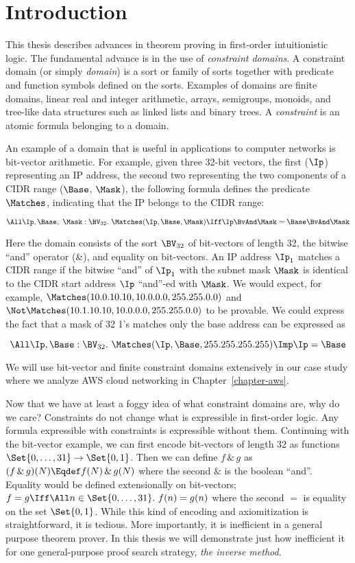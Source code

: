 \chapter{Introduction}
\label{chapter-introduction}

This thesis describes advances in theorem proving in first-order intuitionistic
logic.  The fundamental advance is in the use of \emph{constraint domains}.  A
constraint domain (or simply \emph{domain}) is a sort or family of sorts
together with predicate and function symbols defined on the sorts.  Examples of
domains are finite domains, linear real and integer arithmetic, arrays,
semigroups, monoids, and tree-like data structures such as linked lists and
binary trees.  A \emph{constraint} is an atomic formula belonging to a domain.

An example of a domain that is useful in applications to computer networks is
bit-vector arithmetic.  For example, given three 32-bit vectors, the first
($\Ip$) representing an IP address, the second two representing the two
components of a CIDR range ($\Base$, $\Mask$), the following formula defines the
predicate $\Matches$, indicating that the IP belongs to the CIDR range:

\[
\All\Ip, \Base,\ \Mask: \BV_{32}.\
  \Matches(\Ip, \Base, \Mask) \Iff \Ip \BvAnd \Mask = \Base\BvAnd\Mask
\]

\noindent
Here the domain consists of the sort $\BV_{32}$ of bit-vectors of length 32,
the bitwise ``and'' operator (\&), and equality on bit-vectors.  An IP address
$\Ip_1$ matches a CIDR range if the bitwise ``and'' of $\Ip_1$ with the subnet
mask $\Mask$ is identical to the CIDR start address $\Ip$ ``and''-ed with
$\Mask$.  We would expect, for example,
$\Matches(10.0.10.10, 10.0.0.0, 255.255.0.0)$ and
$\Not\Matches(10.1.10.10, 10.0.0.0, 255.255.0.0)$ to be
provable.  We could express the fact that a mask of 32 1's matches only the base address
can be expressed as

\[
\All\Ip, \Base: \BV_{32}.\
  \Matches(\Ip, \Base, 255.255.255.255) \Imp \Ip = \Base
\]

\noindent
We will use bit-vector and finite constraint domains extensively in our case
study where we analyze AWS cloud networking in Chapter~\ref{chapter-aws}.

Now that we have at least a foggy idea of what constraint domains are, why do we
care?  Constraints do not change what is expressible in first-order logic.
Any formula expressible with constraints is expressible without them.
Continuing with the bit-vector example, we can first encode bit-vectors of
length 32 as functions $\Set{0, \ldots, 31} \to \Set{0, 1}$.  Then we can define
$f\,\&\,g$ as $(f\,\&\,g)(N) \Eqdef f(N)\,\&\,g(N)$ where the second $\&$ is
the boolean ``and''.  Equality would be defined extensionally on bit-vectors;
$f = g \Iff \All n\in\Set{0,\ldots, 31}.\ f(n) = g(n)$ where the second $=$
is equality on the set $\Set{0,1}$.  While this kind of encoding and
axiomitization is straightforward, it is tedious.  More importantly, it is
inefficient in a general purpose theorem prover.  In this thesis we will
demonstrate just how inefficient it for one general-purpose proof search
strategy, \emph{the inverse method}.

